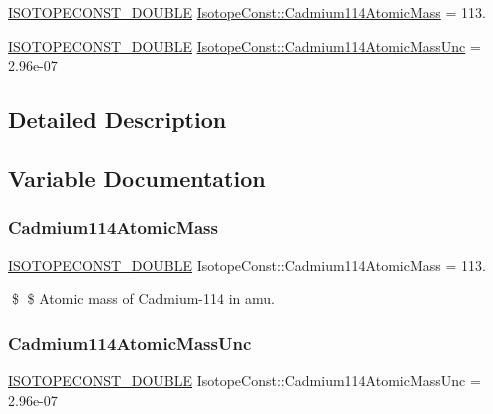 \begin{DoxyCompactItemize}
\item 
\mbox{\hyperlink{group___isotope_const-_macros_ga8f45a7272ce02c0b4c65c44636ed719a}{I\+S\+O\+T\+O\+P\+E\+C\+O\+N\+S\+T\+\_\+\+D\+O\+U\+B\+LE}} \mbox{\hyperlink{group___isotope_const-_cadmium-_cd114_ga7c2a6b144ccfdef9f2548c312231d46a}{Isotope\+Const\+::\+Cadmium114\+Atomic\+Mass}} = 113.
\item 
\mbox{\hyperlink{group___isotope_const-_macros_ga8f45a7272ce02c0b4c65c44636ed719a}{I\+S\+O\+T\+O\+P\+E\+C\+O\+N\+S\+T\+\_\+\+D\+O\+U\+B\+LE}} \mbox{\hyperlink{group___isotope_const-_cadmium-_cd114_gaafdff4503edc11f9810d3661f3eb0ce8}{Isotope\+Const\+::\+Cadmium114\+Atomic\+Mass\+Unc}} = 2.\+96e-\/07
\end{DoxyCompactItemize}


\subsection{Detailed Description}


\subsection{Variable Documentation}
\mbox{\label{group___isotope_const-_cadmium-_cd114_ga7c2a6b144ccfdef9f2548c312231d46a}} 
\subsubsection{\texorpdfstring{Cadmium114\+Atomic\+Mass}{Cadmium114AtomicMass}}
{\footnotesize\ttfamily \mbox{\hyperlink{group___isotope_const-_macros_ga8f45a7272ce02c0b4c65c44636ed719a}{I\+S\+O\+T\+O\+P\+E\+C\+O\+N\+S\+T\+\_\+\+D\+O\+U\+B\+LE}} Isotope\+Const\+::\+Cadmium114\+Atomic\+Mass = 113.}

\$ \$ Atomic mass of Cadmium-\/114 in amu. \mbox{\label{group___isotope_const-_cadmium-_cd114_gaafdff4503edc11f9810d3661f3eb0ce8}} 
\subsubsection{\texorpdfstring{Cadmium114\+Atomic\+Mass\+Unc}{Cadmium114AtomicMassUnc}}
{\footnotesize\ttfamily \mbox{\hyperlink{group___isotope_const-_macros_ga8f45a7272ce02c0b4c65c44636ed719a}{I\+S\+O\+T\+O\+P\+E\+C\+O\+N\+S\+T\+\_\+\+D\+O\+U\+B\+LE}} Isotope\+Const\+::\+Cadmium114\+Atomic\+Mass\+Unc = 2.\+96e-\/07}

